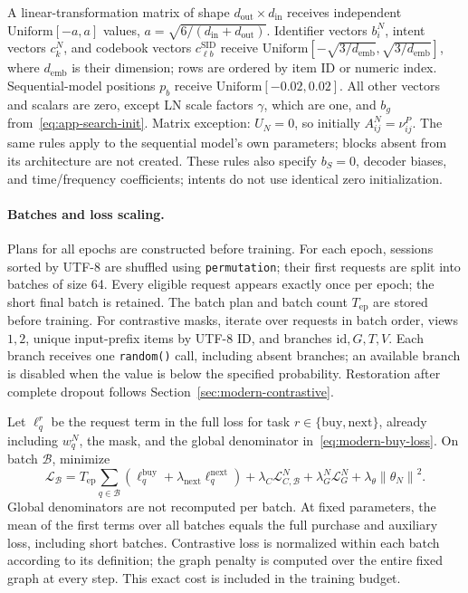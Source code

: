 \documentclass[12pt,a4paper]{article}
\newcommand{\code}[1]{{\ttfamily\small\nolinkurl{#1}}}
\newcommand{\norm}[1]{\left\lVert#1\right\rVert}
\theoremstyle{plainru}
\begin{document}
A linear-transformation matrix of shape $d_{\mathrm{out}}\times
d_{\mathrm{in}}$ receives independent
$\mathrm{Uniform}[-a,a]$ values, $a=\sqrt{6/(d_{\mathrm{in}}+d_{\mathrm{out}})}$.
Identifier vectors $b_i^N$, intent vectors $c_k^N$, and codebook vectors
$c_{\ell b}^{\mathrm{SID}}$ receive
$\mathrm{Uniform}[-\sqrt{3/d_{\mathrm{emb}}},\sqrt{3/d_{\mathrm{emb}}}]$,
where $d_{\mathrm{emb}}$ is their dimension;
rows are ordered by item ID or numeric index.
Sequential-model positions $p_b$ receive
$\mathrm{Uniform}[-0.02,0.02]$. All other vectors and scalars are zero,
except LN scale factors $\gamma$, which are one,
and $b_g$ from~\eqref{eq:app-search-init}.
Matrix exception: $U_N=0$, so initially $A_{ij}^N=\nu_{ij}^P$.
The same rules apply to the sequential model's own parameters;
blocks absent from its architecture are not created.
These rules also specify $b_S=0$, decoder biases, and time/frequency
coefficients; intents do not use identical zero initialization.

\paragraph{Batches and loss scaling.}
Plans for all epochs are constructed before training. For each epoch,
sessions sorted by UTF-8 are shuffled using
\code{permutation}; their first requests are split into batches of size 64.
Every eligible request appears exactly once per epoch;
the short final batch is retained. The batch plan and batch count
$T_{\mathrm{ep}}$ are stored before training.
For contrastive masks, iterate over requests in batch order, views
$1,2$, unique input-prefix items by UTF-8 ID, and branches
$\mathrm{id},G,T,V$. Each branch receives one
\code{random()} call, including absent branches; an available branch is disabled
when the value is below the specified probability. Restoration
after complete dropout follows Section~\ref{sec:modern-contrastive}.

Let $\ell_q^r$ be the request term in the full loss for task
$r\in\{\mathrm{buy},\mathrm{next}\}$, already including $w_q^N$,
the mask, and the global denominator in~\eqref{eq:modern-buy-loss}.
On batch $\mathcal B$, minimize
\begin{equation}\label{eq:modern-batch-loss}
\mathcal L_{\mathcal B}
=T_{\mathrm{ep}}\sum_{q\in\mathcal B}
(\ell_q^{\mathrm{buy}}+\lambda_{\mathrm{next}}\ell_q^{\mathrm{next}})
+\lambda_C\mathcal L_{C,\mathcal B}^N
+\lambda_G^N\mathcal L_G^N+\lambda_\theta\norm{\theta_N}^2.
\end{equation}
Global denominators are not recomputed per batch.
At fixed parameters, the mean of the first terms over all batches
equals the full purchase and auxiliary loss, including short
batches. Contrastive loss is normalized within each batch according to its
definition; the graph penalty is computed over the entire fixed graph
at every step. This exact cost is included in the training budget.
\end{document}
